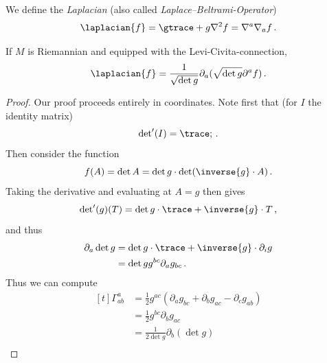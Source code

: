 \documentclass[titlepage,numbers=noenddot,oneside,%
cleardoublepage=empty,paper=a4,fontsize=11pt,%
english,%
]{scrartcl}
\newcommand*{\mathcomma}{\,,}
\newcommand*{\mathfullstop}{\,.}
\begin{document}
\begin{definition}
    We define the \emph{Laplacian} (also called \emph{Laplace--Beltrami-Operator})
    \begin{equation*}
        \laplacian{f}=\gtrace+{g}{\nabla^2 f}=\nabla^a \nabla_a f\mathfullstop
    \end{equation*}
\end{definition}
\begin{lemma}\label{lem:laplacian_in_terms_of_metric_determinant}
    If \( M \) is Riemannian and equipped with the Levi-Civita-connection,
    \begin{equation*}
        \laplacian{f}=\frac{1}{\sqrt{\det{g}}}\partial_{a}(\sqrt{\det{g}}\partial^a f)\mathfullstop
    \end{equation*}    
\end{lemma}
\begin{proof}
    Our proof proceeds entirely in coordinates. Note first that (for \( I \) the identity matrix)
    \begin{equation*}
        \det\nolimits'(I)=\trace;\mathfullstop
    \end{equation*}
    Then consider the function
    \begin{equation*}
        f(A)=\det{A}=\det{g}\cdot \det(\inverse{g}\cdot A)\mathfullstop
    \end{equation*}
    Taking the derivative and evaluating at \( A=g \) then gives
    \begin{equation*}
        \det\nolimits'(g)(T)=\det{g}\cdot \trace+{\inverse{g}\cdot T}\mathcomma
    \end{equation*}
    and thus
    \begin{equation*}
        \begin{aligned}[t]
            \partial_a \det{g}&=\det{g}\cdot \trace+{\inverse{g}\cdot \partial_i g}\\
            &=\det{g}g^{bc}\partial_{a}g_{bc}\mathfullstop
        \end{aligned}
    \end{equation*}
    Thus we can compute
    \begin{equation*}
        \begin{aligned}[t]
            \Gamma^{a}_{ab}&=\frac{1}{2}g^{ac}(\partial_a g_{bc}+\partial_b g_{ac}-\partial_c g_{ab})\\
            &=\frac{1}{2}g^{bc}\partial_b g_{ac}\\
            &=\frac{1}{2\det{g}}\partial_b(\det{g})\\

\end{aligned}
\end{equation*}
\end{proof}
\end{document}
